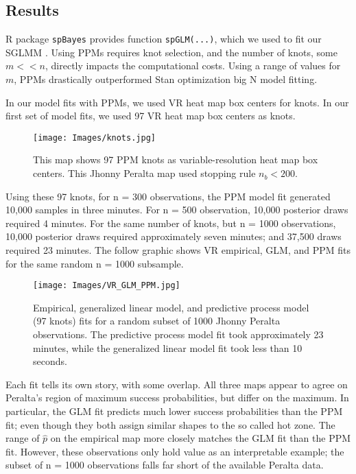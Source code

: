 \subsection{Results} \label{PPMresults}

R package \verb|spBayes| provides function \verb|spGLM(...)|, which we used to fit our SGLMM \citep{Finley2013}. Using PPMs requires knot selection, and the number of knots, some $m < < n$, directly impacts the computational costs. Using a range of values for $m$, PPMs drastically outperformed Stan optimization big N model fitting. 

In our model fits with PPMs, we used VR heat map box centers for knots. In our first set of model fits, we used 97 VR heat map box centers as knots. 
  \begin{figure}[H]
	\centering 
	\texttt{[image: Images/knots.jpg]}
	\caption{This map shows 97 PPM knots as variable-resolution heat map box centers. This Jhonny Peralta map used stopping rule $n_{b} < 200$.}
	\end{figure}
Using these 97 knots, for n = 300 observations, the PPM model fit generated 10,000 samples in three minutes. For n = 500 observation, 10,000 posterior draws required 4 minutes. For the same number of knots, but n = 1000 observations, 10,000 posterior draws required approximately seven minutes; and 37,500 draws required 23 minutes. The follow graphic shows VR empirical, GLM, and PPM fits for the same random n = 1000 subsample.
  \begin{figure}[H]
	\centering 
	\texttt{[image: Images/VR\_GLM\_PPM.jpg]}
	\caption{Empirical, generalized linear model, and predictive process model (97 knots) fits for a random subset of 1000 Jhonny Peralta observations. The predictive process model fit took approximately 23 minutes, while the generalized linear model fit took less than 10 seconds.}
	\label{fig:comps1}
	\end{figure}
Each fit tells its own story, with some overlap. All three maps appear to agree on Peralta's region of maximum success probabilities, but differ on the maximum. In particular, the GLM fit predicts much lower success probabilities than the PPM fit; even though they both assign similar shapes to the so called hot zone. The range of $\hat{p}$ on the empirical map more closely matches the GLM fit than the PPM fit. However, these observations only hold value as an interpretable example; the subset of n = 1000 observations falls far short of the available Peralta data.

